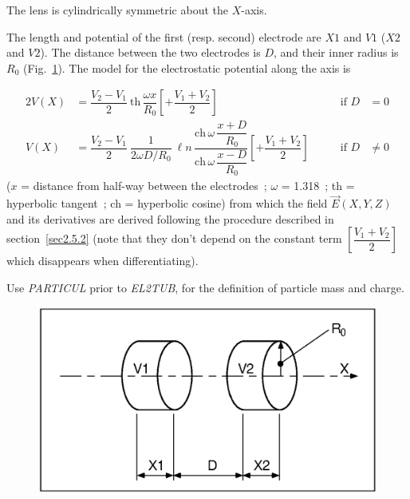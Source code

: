 The lens is cylindrically symmetric about the $ X$-axis. 

\noindent The length and potential of the first (resp. second) electrode 
are $ X1 $ and $ V1 $ ($ X2 $ and $ V2$).   The distance between the two 
electrodes is $ D$,   and their inner radius is $ R_0 $ (Fig.~\ref{fig22}).   
The model for the electrostatic potential along the axis is~\cite{Biblio16}     %

 \begin{alignat*}{2}
	 V(X) &   = \dfrac{ V_2-V_1}{2} \: \text{th}\,
	            \dfrac{\omega x }{ R_0} 
	             \left[+ \dfrac{V_1+V_2 }{ 2} \right] 
	      & \qquad \text{if }  D & =0\\
	V(X) &  =  \dfrac{ V_2-V_1 }{ 2}\: \dfrac{1}{ 2\omega D/R_0} \: \ell n\,
	           \dfrac{\text{ch}\, \omega\,    \dfrac{x+D }{ R_0} }%
	           {\text{ch} \,\omega \,\dfrac{x-D }{ R_0}}
	           \left[+ \dfrac{V_1+V_2 }{ 2} \right]   
	            & \qquad \text{if }  D &  \not= 0 
 \end{alignat*}
%
($ x $ = distance from half-way between the electrodes~;
$\omega$  =  1.318~; th =  hyperbolic tangent~; ch  =  hyperbolic cosine)
from which the field $ \vec  E(X,Y,Z) $ and its derivatives are derived following the 
procedure described in section~\ref{sec2.5.2}  (note that they don't 
depend on the constant term $ \left[\dfrac{V_1+V_2 }{ 2} \right] $ which
disappears when differentiating). 

\medskip

\noindent Use \textsl{PARTICUL} prior to \textsl{EL2TUB}, for the
 definition of  particle mass and charge.

\vfill

\begin{figure}[H]
\centerline{\includegraphics[width=14cm]{Fig22.ps}}
\caption{\CapELtwoTUB \label{fig22}}
\end{figure}

